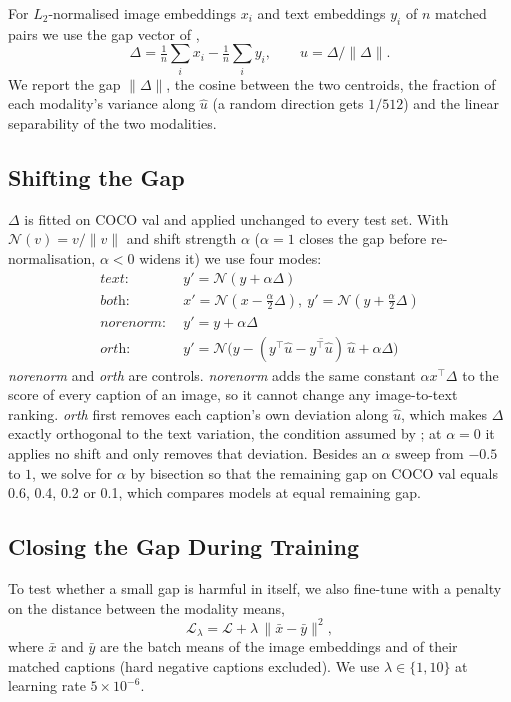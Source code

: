 \documentclass{article}
\newcommand{\uhat}{\hat{u}}
\newcommand{\gapnorm}{\lVert\Delta\rVert}
\begin{document}
For $L_2$-normalised image embeddings $x_i$ and text embeddings $y_i$ of $n$ matched pairs we use the gap vector of \citet{liang2022gap},
\begin{equation}
\Delta = \tfrac{1}{n}\textstyle\sum_i x_i - \tfrac{1}{n}\sum_i y_i, \qquad \uhat = \Delta/\gapnorm .
\end{equation}
We report the gap $\gapnorm$, the cosine between the two centroids, the fraction of each modality's variance along $\uhat$ (a random direction gets $1/512$) and the linear separability of the two modalities.

\subsection{Shifting the Gap}

$\Delta$ is fitted on COCO val and applied unchanged to every test set. With $\mathcal{N}(v)=v/\lVert v\rVert$ and shift strength $\alpha$ ($\alpha{=}1$ closes the gap before re-normalisation, $\alpha{<}0$ widens it) we use four modes:
\begin{align}
\textit{text:}\ \ & y' = \mathcal{N}(y+\alpha\Delta) \label{eq:text}\\
\textit{both:}\ \ & x' = \mathcal{N}(x-\tfrac{\alpha}{2}\Delta),\ y' = \mathcal{N}(y+\tfrac{\alpha}{2}\Delta) \\
\textit{norenorm:}\ \ & y' = y+\alpha\Delta \label{eq:norenorm}\\
\textit{orth:}\ \ & y' = \mathcal{N}\big(y - (y^\top\uhat - \overline{y^\top\uhat})\,\uhat + \alpha\Delta\big) \label{eq:orth}
\end{align}
\emph{norenorm} and \emph{orth} are controls. \emph{norenorm} adds the same constant $\alpha x^\top\Delta$ to the score of every caption of an image, so it cannot change any image-to-text ranking. \emph{orth} first removes each caption's own deviation along $\uhat$, which makes $\Delta$ exactly orthogonal to the text variation, the condition assumed by \citet{chowers2026bug}; at $\alpha{=}0$ it applies no shift and only removes that deviation. Besides an $\alpha$ sweep from $-0.5$ to $1$, we solve for $\alpha$ by bisection so that the remaining gap on COCO val equals 0.6, 0.4, 0.2 or 0.1, which compares models at equal remaining gap.

\subsection{Closing the Gap During Training}

To test whether a small gap is harmful in itself, we also fine-tune with a penalty on the distance between the modality means,
\begin{equation}
\mathcal{L}_{\lambda} = \mathcal{L} + \lambda\,\lVert \bar x - \bar y\rVert^2 ,
\label{eq:penalty}
\end{equation}
where $\bar x$ and $\bar y$ are the batch means of the image embeddings and of their matched captions (hard negative captions excluded). We use $\lambda\in\{1, 10\}$ at learning rate $5{\times}10^{-6}$.
\end{document}
